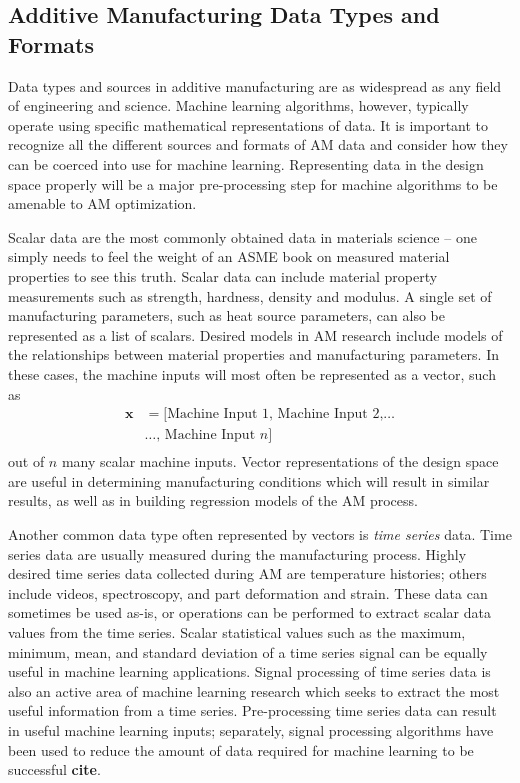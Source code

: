 \subsection{Additive Manufacturing Data Types and Formats}
Data types and sources in additive manufacturing are as widespread as any field of engineering and science. Machine learning algorithms, however, typically operate using specific mathematical representations of data. It is important to recognize all the different sources and formats of AM data and consider how they can be coerced into use for machine learning. Representing data in the design space properly will be a major pre-processing step for machine algorithms to be amenable to AM optimization.

Scalar data are the most commonly obtained data in materials science -- one simply needs to feel the weight of an ASME book on measured material properties to see this truth. Scalar data can include material property measurements such as strength, hardness, density and modulus. A single set of manufacturing parameters, such as heat source parameters, can also be represented as a list of scalars. Desired models in AM research include models of the relationships between material properties and manufacturing parameters. In these cases, the machine inputs will most often be represented as a vector, such as
\begin{equation}
\begin{split}
	\mathbf{x} & = \text{[} \text{Machine Input 1, Machine Input 2,} \hdots  \\
		& \hdots \text{, Machine Input } n \text{]} \\
	\label{vector}
\end{split}
\end{equation}
out of $n$ many scalar machine inputs. Vector representations of the design space are useful in determining manufacturing conditions which will result in similar results, as well as in building regression models of the AM process.


Another common data type often represented by vectors is \textit{time series} data. Time series data are usually measured during the manufacturing process. Highly desired time series data collected during AM are temperature histories; others include videos, spectroscopy, and part deformation and strain. These data can sometimes be used as-is, or operations can be performed to extract scalar data values from the time series. Scalar statistical values such as the maximum, minimum, mean, and standard deviation of a time series signal can be equally useful in machine learning applications. Signal processing of time series data is also an active area of machine learning research which seeks to extract the most useful information from a time series. Pre-processing time series data can result in useful machine learning inputs; separately, signal processing algorithms have been used to reduce the amount of data required for machine learning to be successful \textbf{cite}.

